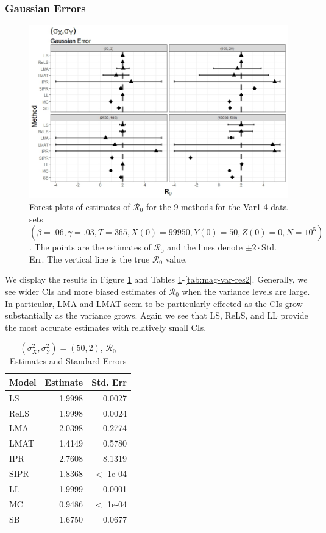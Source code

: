 \documentclass[12pt]{article}
\newcommand{\xxsir}{\ensuremath{9} } %
\newcommand{\rr}{\ensuremath{\mathcal{R}_0}}
\begin{document}
\subsubsection{Gaussian Errors}

\begin{figure}[H]
\begin{center}
  \includegraphics[scale=0.5]{images/var_n.jpeg}
  \caption{Forest plots of estimates of $\rr$ for the \xxsir methods for the Var1-4 data sets $(\beta=.06, \gamma=.03, T=365, X(0)=99950, Y(0)=50, Z(0)=0, N=10^5)$.  The points are the estimates of $\rr$ and the lines denote $\pm 2\cdot $Std. Err.  The vertical line is the true $\rr$ value.}
  \label{fig:mag-var-res}
\end{center}
\end{figure}

We display the results in Figure \ref{fig:mag-var-res} and Tables \ref{tab:mag-var-res1}-\ref{tab:mag-var-res2}.  Generally, we see wider CIs and more biased estimates of $\rr$ when the variance levels are large.  In particular, LMA and LMAT seem to be particularly effected as the CIs grow substantially as the variance grows.  Again we see that LS, ReLS, and LL provide the most accurate estimates with relatively small CIs.

\begin{table}[H]
	

	\centering
	\begin{tabular}[t]{l|r|r}
		\hline
		Model & Estimate & Std. Err\\
		\hline
		LS & 1.9998 & 0.0027\\
		\hline
		ReLS & 1.9998 & 0.0024\\
		\hline
		LMA & 2.0398 & 0.2774\\
		\hline
		LMAT & 1.4149 & 0.5780\\
		\hline
		IPR & 2.7608 & 8.1319\\
		\hline
		SIPR & 1.8368 & $<$ 1e-04\\
		\hline
		LL & 1.9999 & 0.0001\\
		\hline
		MC & 0.9486 & $<$ 1e-04\\
		\hline
		SB & 1.6750 & 0.0677\\
		\hline
	\end{tabular}
        	\caption{ $(\sigma^2_X, \sigma^2_Y) = (50, 2)$, $\rr$ Estimates and Standard Errors}\label{tab:mag-var-res1}
\end{table}
\end{document}

